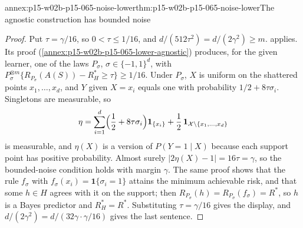 \begin{annexitem}{annex:p15-w02b-p15-065-noise-lower}{thm:p15-w02b-p15-065-noise-lower}{The agnostic construction has bounded noise}
\begin{proof}
Put \(\tau=\gamma/16\), so \(0<\tau\leq1/16\), and
\(d/(512\tau^2)=d/(2\gamma^2)\geq m\).
 applies. Its proof
(\cref{annex:p15-w02b-p15-065-lower-agnostic}) produces, for the given
learner, one of the laws \(P_\sigma\), \(\sigma\in\{-1,1\}^d\), with
\(P_\sigma^{\otimes m}\{R_{P_\sigma}(A(S))-R_H^{*}\geq\tau\}\geq1/16\).
Under \(P_\sigma\), \(X\) is uniform on the shattered points
\(x_1,\ldots,x_d\), and \(Y\) given \(X=x_i\) equals one with probability
\(1/2+8\tau\sigma_i\). Singletons are measurable, so
\[
 \eta=\sum_{i=1}^d\Bigl(\frac12+8\tau\sigma_i\Bigr)\mathbf1_{\{x_i\}}
 +\frac12\,\mathbf1_{\mathcal X\setminus\{x_1,\ldots,x_d\}}
\]
is measurable, and \(\eta(X)\) is a version of \(P(Y=1\mid X)\) because
each support point has positive probability. Almost surely
\(|2\eta(X)-1|=16\tau=\gamma\), so the bounded-noise condition holds with
margin \(\gamma\). The same proof shows that the rule \(f_\sigma\) with
\(f_\sigma(x_i)=\mathbf1\{\sigma_i=1\}\) attains the minimum achievable
risk, and that some \(h\in H\) agrees with it on the support; then
\(R_{P_\sigma}(h)=R_{P_\sigma}(f_\sigma)=R^{*}\), so \(h\) is a Bayes
predictor and \(R_H^{*}=R^{*}\). Substituting \(\tau=\gamma/16\) gives the
display, and \(d/(2\gamma^2)=d/(32\gamma\cdot\gamma/16)\) gives the last
sentence.
\end{proof}
\end{annexitem}

